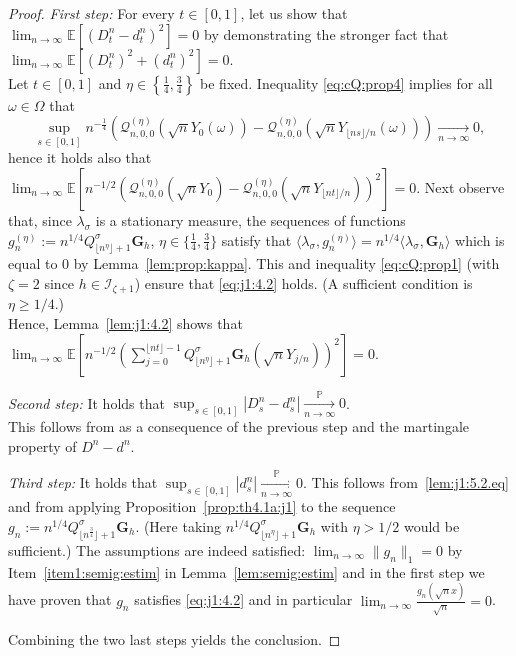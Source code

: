 \documentclass[12pt]{article}
\numberwithin{equation}{section}
\theoremstyle{definition}
\theoremstyle{remark}
\newcommand{\convp}[1][]{\xrightarrow[#1]{\PP}}
\newcommand{\PP}{\mathbb{P}}
\newcommand{\EE}{\mathbb{E}}
\newcommand{\cQ}{\mathcal{Q}}
\newcommand{\Lg}[1]{\mathcal{I}_{#1}}
\newcommand{\bfG}[1]{\mathbf{G}_{#1}}
\begin{document}
\begin{proof}
{\em First step:\/} For every $t\in [0,1]$, let us show that $\lim_{n\to\infty} \EE\!\left[( D^n_t-d^n_t)^2\right]=0$ by demonstrating the stronger fact that $\lim_{n\to\infty} \EE\!\left[(D_t^n)^2+(d_t^n)^2\right]=0$.\\
Let $t\in [0,1]$ and $\eta \in \left\{ \frac14, \frac34 \right\}$ be fixed.
Inequality \eqref{eq:cQ:prop4} implies for all $\omega\in \Omega$ that
\begin{equation} \label{lem:j1:5.2.eq}
	\sup_{s\in [0,1]} n^{-\frac14} \left( \cQ^{(\eta)}_{n,0,0}(\sqrt{n} Y_0(\omega)) -  \cQ^{(\eta)}_{n,0,0}(\sqrt{n} Y_{\lfloor n s\rfloor/n}(\omega)) \right)
\xrightarrow[n\to\infty]{} 0,
\end{equation}
hence it holds also that 
$
	\lim_{n\to\infty} \EE\!\left[n^{-1/2} \left( \cQ^{(\eta)}_{n,0,0}(\sqrt{n} Y_0) -  \cQ^{(\eta)}_{n,0,0}(\sqrt{n} Y_{\lfloor n t\rfloor/n}) \right)^2 \right]=0.
$
%
%
Next observe that, since $\lambda_\sigma$ is a stationary measure, the sequences of functions $g_n^{(\eta)} := n^{1/4} Q^\sigma_{\lfloor n^{\eta}\rfloor +1} \bfG{h} $, $\eta \in \{\tfrac14,\tfrac34\}$ satisfy that $\langle \lambda_\sigma , g_n^{(\eta)} \rangle = n^{1/4} \langle \lambda_\sigma , \bfG{h} \rangle$ which is equal to 0 by Lemma~\ref{lem:prop:kappa}. This and inequality \eqref{eq:cQ:prop1} (with $\zeta=2$ since $h\in \Lg{\zeta+1}$) 
ensure that \eqref{eq:j1:4.2} holds. (A sufficient condition is $\eta \geq 1/4$.)\\
Hence, Lemma~\ref{lem:j1:4.2} shows that
$
	\lim_{n\to\infty} \EE\!\left[ n^{-1/2} \left(\sum_{j=0}^{\lfloor n t \rfloor -1} Q^\sigma_{\lfloor n^{\eta}\rfloor +1} \bfG{h} (\sqrt n Y_{{j}/{n}})\right)^2\right]=0.
$
%
%

{\em Second step:\/} It holds that $\sup_{s\in [0,1]} |D^n_s - d_s^n|\convp[n\to\infty] 0$.\\
This follows from \cite[Proposition~1.2]{aldous89} as a consequence of the previous step and the martingale property of $D^n - d^n$.

{\em Third step:\/} It holds that $\sup_{s\in [0,1]} |d_s^n| \convp[n\to\infty] 0$.
This follows from~\eqref{lem:j1:5.2.eq} and from applying Proposition~\ref{prop:th4.1a:j1} to the sequence $g_n:= n^{1/4} Q^\sigma_{\lfloor n^\frac34\rfloor +1} \bfG{h} $. (Here taking $n^{1/4} Q^\sigma_{\lfloor n^{\eta} \rfloor +1} \bfG{h}$ with $\eta>1/2$ would be sufficient.)
The assumptions are indeed satisfied: $\lim_{n\to\infty} \|g_n\|_{1} =0$ by Item~\ref{item1:semig:estim} in Lemma~\ref{lem:semig:estim}
 and in the first step we have proven that  $g_n$ satisfies \eqref{eq:j1:4.2} and in particular $\lim_{n\to\infty} \frac{g_n(\sqrt{n}x)}{\sqrt{n}}=0$.

Combining the two last steps yields the conclusion.
\end{proof}
\end{document}
